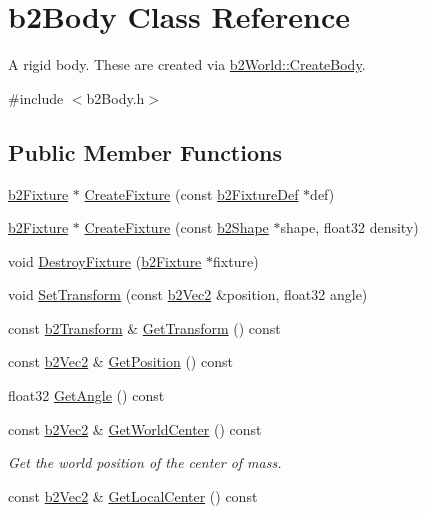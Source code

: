 \hypertarget{classb2_body}{\section{b2\-Body Class Reference}
\label{classb2_body}
}


A rigid body. These are created via \hyperlink{classb2_world_a2eb36e967e43294bfa03ec3d177c2dae}{b2\-World\-::\-Create\-Body}.  




{\ttfamily \#include $<$b2\-Body.\-h$>$}

\subsection*{Public Member Functions}
\begin{DoxyCompactItemize}
\item 
\hyperlink{classb2_fixture}{b2\-Fixture} $\ast$ \hyperlink{classb2_body_aa4892301e9b9d62ede5e93dad1743894}{Create\-Fixture} (const \hyperlink{structb2_fixture_def}{b2\-Fixture\-Def} $\ast$def)
\item 
\hyperlink{classb2_fixture}{b2\-Fixture} $\ast$ \hyperlink{classb2_body_a52d971867086d5db79769a62bbb70a60}{Create\-Fixture} (const \hyperlink{classb2_shape}{b2\-Shape} $\ast$shape, float32 density)
\item 
void \hyperlink{classb2_body_a856d1df86b7bded91f02d8cfcaea1c2f}{Destroy\-Fixture} (\hyperlink{classb2_fixture}{b2\-Fixture} $\ast$fixture)
\item 
void \hyperlink{classb2_body_a4686f32bbce5723761e9719c706eca11}{Set\-Transform} (const \hyperlink{structb2_vec2}{b2\-Vec2} \&position, float32 angle)
\item 
const \hyperlink{structb2_transform}{b2\-Transform} \& \hyperlink{classb2_body_adaaebca750d0bda56a543884adc5f519}{Get\-Transform} () const 
\item 
const \hyperlink{structb2_vec2}{b2\-Vec2} \& \hyperlink{classb2_body_a798da9dc2d47431912d991d152b13711}{Get\-Position} () const 
\item 
float32 \hyperlink{classb2_body_a57c4a1946a6dd5a00e28691bc419fdcd}{Get\-Angle} () const 
\item 
\hypertarget{classb2_body_a04db0c7b12b315802e58b33884f4f63c}{const \hyperlink{structb2_vec2}{b2\-Vec2} \& \hyperlink{classb2_body_a04db0c7b12b315802e58b33884f4f63c}{Get\-World\-Center} () const }\label{classb2_body_a04db0c7b12b315802e58b33884f4f63c}

\begin{DoxyCompactList}\small\item\em Get the world position of the center of mass. \end{DoxyCompactList}\item 
\hypertarget{classb2_body_a27ed7f8a3b36ddfb01069ee8f7106033}{const \hyperlink{structb2_vec2}{b2\-Vec2} \& \hyperlink{classb2_body_a27ed7f8a3b36ddfb01069ee8f7106033}{Get\-Local\-Center} () const }\label{classb2_body_a27ed7f8a3b36ddfb01069ee8f7106033}


\end{DoxyCompactItemize}
